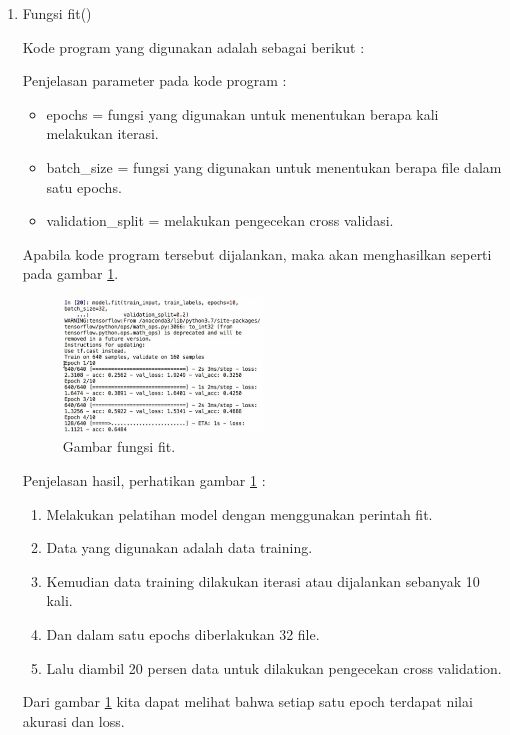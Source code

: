\begin{enumerate}
\item Fungsi fit()
	\par Kode program yang digunakan adalah sebagai berikut :
	
	\par Penjelasan parameter pada kode program :
	\begin{itemize}
	\item epochs = fungsi yang digunakan untuk menentukan berapa kali melakukan iterasi.
	\item batch\_size = fungsi yang digunakan untuk menentukan berapa file dalam satu epochs.
	\item validation\_split = melakukan pengecekan cross validasi.
	\end{itemize}
	
	\par Apabila kode program tersebut dijalankan, maka akan menghasilkan seperti pada gambar \ref{no17}.
	
		\begin{figure}[ht]
		\centerline{\includegraphics[width=0.5\textwidth]{figures/chapter6/no17.jpg}}
		\caption{Gambar fungsi fit.}
		\label{no17}
		\end{figure}
		
	\par Penjelasan hasil, perhatikan gambar \ref{no17} :
	\begin{enumerate}
	\item Melakukan pelatihan model dengan menggunakan perintah fit.
	\item Data yang digunakan adalah data training.
	\item Kemudian data training dilakukan iterasi atau dijalankan sebanyak 10 kali.
	\item Dan dalam satu epochs diberlakukan 32 file.
	\item Lalu diambil 20 persen data untuk dilakukan pengecekan cross validation.
	\end{enumerate}
	
	\par Dari gambar \ref{no17} kita dapat melihat bahwa setiap satu epoch terdapat nilai akurasi dan loss.


\end{enumerate}
